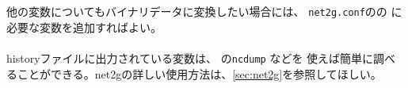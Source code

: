 他の変数についてもバイナリデータに変換したい場合には、
\verb|net2g.conf|のの に必要な変数を追加すればよい。\\

\\

\noindent
historyファイルに出力されている変数は、{\netcdf} の\verb|ncdump| などを
使えば簡単に調べることができる。net2gの詳しい使用方法は、\ref{sec:net2g}を参照してほしい。




